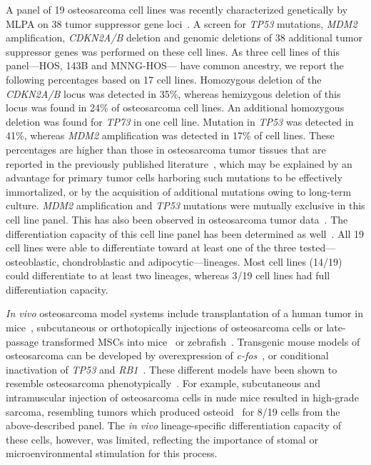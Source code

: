 A panel of 19 osteosarcoma cell lines was recently characterized
genetically by MLPA on 38 tumor suppressor gene
loci~\cite{ottaviano2010molecular}. A screen for {\it TP53} mutations, {\it MDM2} amplification,
{\it CDKN2A/B} deletion and genomic deletions of 38 additional
tumor suppressor genes was performed on these cell lines. As
three cell lines of this panel---HOS, 143B and MNNG-HOS---
have common ancestry, we report the following percentages
based on 17 cell lines. Homozygous deletion of the
{\it CDKN2A/B} locus was detected in 35\%, whereas hemizygous
deletion of this locus was found in 24\% of osteosarcoma cell
lines. An additional homozygous deletion was found for
{\it TP73} in one cell line. Mutation in {\it TP53} was detected in 41\%,
whereas {\it MDM2} amplification was detected in 17\% of cell
lines. These percentages are higher than those in osteosarcoma
tumor tissues that are reported in the previously published
literature~\cite{cleton2005central}, which may be explained by an advantage
for primary tumor cells harboring such mutations to be effectively
immortalized, or by the acquisition of additional mutations
owing to long\hyp{}term culture. {\it MDM2} amplification and
{\it TP53} mutations were mutually exclusive in this cell line
panel. This has also been observed in osteosarcoma tumor
data~\cite{overholtzer2003presence}. The differentiation capacity of this cell line panel has
been determined as well~\cite{mohseny2011functional}. All 19 cell lines were able to differentiate
toward at least one of the three tested---osteoblastic,
chondroblastic and adipocytic---lineages. Most cell lines
(14/19) could differentiate to at least two lineages, whereas
3/19 cell lines had full differentiation capacity.

{\it In vivo} osteosarcoma model systems include transplantation
of a human tumor in mice~\cite{mayordomo2010tissue,kresse2011preclinical}, subcutaneous or orthotopically
injections of osteosarcoma cells or late\hyp{}passage
transformed MSCs into mice~\cite{mohseny2009osteosarcoma}
or zebrafish~\cite{mohseny2012osteosarcomazebrafish}. Transgenic
mouse models of osteosarcoma can be developed by overexpression
of {\it c-fos}~\cite{ruther1989c}, or conditional inactivation of {\it TP53} and
{\it RB1}~\cite{walkley2008conditional}. These different models have been shown to resemble
osteosarcoma phenotypically~\cite{mohseny2009osteosarcoma,mohseny2012osteosarcomazebrafish,mohseny2011functional,mayordomo2010tissue,ruther1989c,walkley2008conditional,kuijjer2011mrna,kresse2011preclinical}. For example, subcutaneous
and intramuscular injection of osteosarcoma cells
in nude mice resulted in high\hyp{}grade sarcoma, resembling
tumors which produced osteoid~\cite{mohseny2011functional} for 8/19 cells from the
above\hyp{}described panel. The {\it in vivo} lineage\hyp{}specific differentiation
capacity of these cells, however, was limited, reflecting
the importance of stomal or microenvironmental stimulation
for this process.

